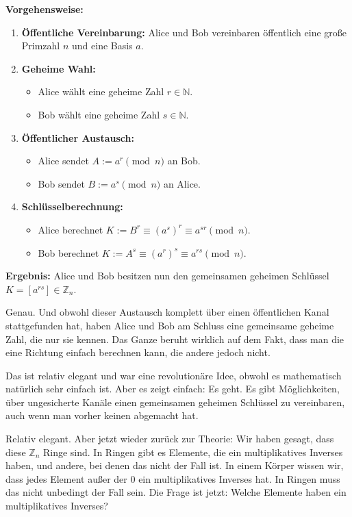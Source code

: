 \begin{math-stroke}
\textbf{Vorgehensweise:}
\begin{enumerate}[label=\textbf{\arabic*.}]
    \item \textbf{Öffentliche Vereinbarung:} Alice und Bob vereinbaren öffentlich eine große Primzahl $n$ und eine Basis $a$.
    \item \textbf{Geheime Wahl:}
    \begin{itemize}
        \item Alice wählt eine geheime Zahl $r \in \mathbb{N}$.
        \item Bob wählt eine geheime Zahl $s \in \mathbb{N}$.
    \end{itemize}
    \item \textbf{Öffentlicher Austausch:}
    \begin{itemize}
        \item Alice sendet $A := a^r \pmod n$ an Bob.
        \item Bob sendet $B := a^s \pmod n$ an Alice.
    \end{itemize}
    \item \textbf{Schlüsselberechnung:}
    \begin{itemize}
        \item Alice berechnet $K := B^r \equiv (a^s)^r \equiv a^{sr} \pmod n$.
        \item Bob berechnet $K := A^s \equiv (a^r)^s \equiv a^{rs} \pmod n$.
    \end{itemize}
\end{enumerate}

\textbf{Ergebnis:} Alice und Bob besitzen nun den gemeinsamen geheimen Schlüssel $K = [a^{rs}] \in \mathbb{Z}_n$.
\end{math-stroke}

\begin{spoken-clean}[00:26:59 - 00:29:03]
Genau. Und obwohl dieser Austausch komplett über einen öffentlichen Kanal stattgefunden hat, haben Alice und Bob am Schluss eine gemeinsame geheime Zahl, die nur sie kennen. Das Ganze beruht wirklich auf dem Fakt, dass man die eine Richtung einfach berechnen kann, die andere jedoch nicht.

Das ist relativ elegant und war eine revolutionäre Idee, obwohl es mathematisch natürlich sehr einfach ist. Aber es zeigt einfach: Es geht. Es gibt Möglichkeiten, über ungesicherte Kanäle einen gemeinsamen geheimen Schlüssel zu vereinbaren, auch wenn man vorher keinen abgemacht hat.

Relativ elegant. Aber jetzt wieder zurück zur Theorie: Wir haben gesagt, dass diese $\mathbb{Z}_n$ Ringe sind. In Ringen gibt es Elemente, die ein multiplikatives Inverses haben, und andere, bei denen das nicht der Fall ist. In einem Körper wissen wir, dass jedes Element außer der $0$ ein multiplikatives Inverses hat. In Ringen muss das nicht unbedingt der Fall sein. Die Frage ist jetzt: Welche Elemente haben ein multiplikatives Inverses?
\end{spoken-clean}

